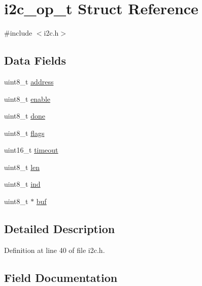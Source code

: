 \hypertarget{structi2c__op__t}{}\section{i2c\+\_\+op\+\_\+t Struct Reference}
\label{structi2c__op__t}


{\ttfamily \#include $<$i2c.\+h$>$}

\subsection*{Data Fields}
\begin{DoxyCompactItemize}
\item 
uint8\+\_\+t \hyperlink{structi2c__op__t_a0f8493e5b2b5a8a3437001068944b3c8}{address}
\item 
uint8\+\_\+t \hyperlink{structi2c__op__t_a482a75434d75a91f2c3b4c8f37dbe201}{enable}
\item 
uint8\+\_\+t \hyperlink{structi2c__op__t_a281b1e75543e100e4bac1f48d35ecd91}{done}
\item 
uint8\+\_\+t \hyperlink{structi2c__op__t_a99ce5c1c16cf8a7b8293f5b96ac74c27}{flags}
\item 
uint16\+\_\+t \hyperlink{structi2c__op__t_a1b20cc2c470b03ecc097a1cd792bbffb}{timeout}
\item 
uint8\+\_\+t \hyperlink{structi2c__op__t_a15938288603b868319e12027d5b0853b}{len}
\item 
uint8\+\_\+t \hyperlink{structi2c__op__t_acad1e9f50a862e2c96c8a62a1ff1694a}{ind}
\item 
uint8\+\_\+t $\ast$ \hyperlink{structi2c__op__t_a1b38c7b78966e4464cfb858f223bf89a}{buf}
\end{DoxyCompactItemize}


\subsection{Detailed Description}


Definition at line 40 of file i2c.\+h.



\subsection{Field Documentation}
\mbox{\label{structi2c__op__t_a0f8493e5b2b5a8a3437001068944b3c8}} 
